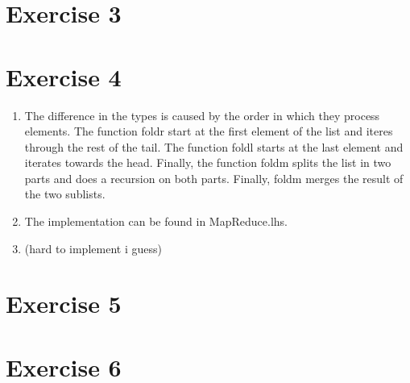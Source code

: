 \documentclass{article}
\begin{document}
\section*{Exercise 3}
\section*{Exercise 4}
\begin{enumerate}
  \item The difference in the types is caused by the order in which they process elements. The function foldr start at the first element of the list and iteres through the rest of the tail. The function foldl starts at the last element and iterates towards the head. Finally, the function foldm splits the list in two parts and does a recursion on both parts. Finally, foldm merges the result of the two sublists.
  \item The implementation can be found in MapReduce.lhs.
  \item (hard to implement i guess)
\end{enumerate}
\section*{Exercise 5}
\section*{Exercise 6}
\end{document}
